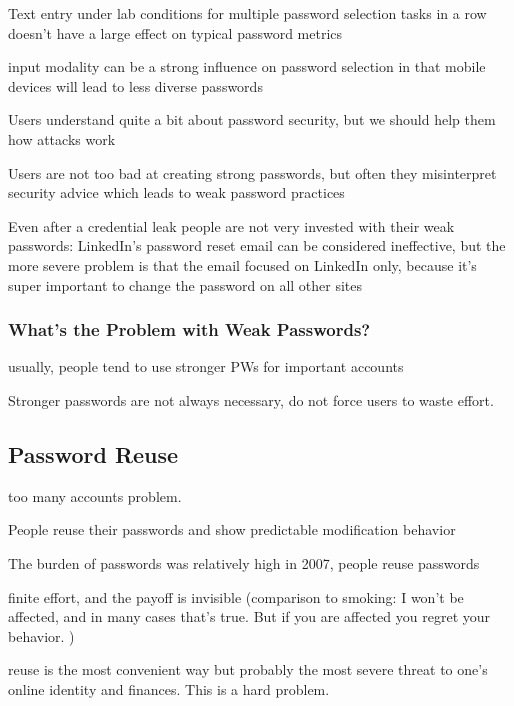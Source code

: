 	
	Text entry under lab conditions for multiple password selection tasks in a row doesn't have a large effect on typical password metrics \cite{Yang2014EntryAffectsPasswordSecurity}
	
	input modality can be a strong influence on password selection in that mobile devices will lead to less diverse passwords \cite{VonZezschwitz2014HoneyIShrunkTheKeys}
	
	Users understand quite a bit about password security, but we should help them how attacks work \cite{Ur2016PerceptionsPassword}
	
	
	Users are not too bad at creating strong passwords, but often they misinterpret security advice which leads to weak password practices \cite{Ur2015PWCreationLab}
	
	Even after a credential leak people are not very invested with their weak passwords: LinkedIn's password reset email can be considered ineffective, but the more severe problem is that the email focused on LinkedIn only, because it's super important to change the password on all other sites \cite{Huh2017TooBusy}
	
	\subsubsection{What's the Problem with Weak Passwords?}
	usually, people tend to use stronger PWs for important accounts
	
	Stronger passwords are not always necessary, do not force users to waste effort. \cite{Florencio2007DoStrongWebPasswords}	
	
	\cite{Shay2014ReligiousAunt}

	\subsection{Password Reuse}
	too many accounts problem.
	
	People reuse their passwords and show predictable modification behavior \cite{Gaw2005ReuseRecycle}
	
	The burden of passwords was relatively high in 2007, people reuse passwords \cite{Florencio2007LargeScaleStudyPasswordHabits}
	
	finite effort, and the payoff is invisible (comparison to smoking: I won't be affected, and in many cases that's true. But if you are affected you regret your behavior. )
	
	reuse is the most convenient way but probably the most severe threat to one's online identity and finances. This is a hard problem. 
	
